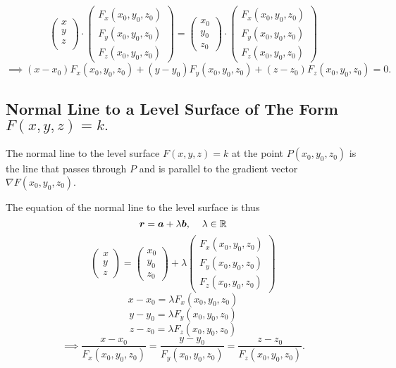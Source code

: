\documentclass{article}
\begin{document}
$$\begin{pmatrix}
    x\\
    y\\
    z\\
\end{pmatrix}\cdot\begin{pmatrix}
    F_x(x_0,y_0,z_0)\\
    F_y(x_0,y_0,z_0)\\
    F_z(x_0,y_0,z_0)
\end{pmatrix}=\begin{pmatrix}
    x_0\\
    y_0\\
    z_0
\end{pmatrix}\cdot\begin{pmatrix}
     F_x(x_0,y_0,z_0)\\
    F_y(x_0,y_0,z_0)\\
    F_z(x_0,y_0,z_0)
\end{pmatrix}$$
$$\implies(x-x_0)F_x(x_0,y_0,z_0)+(y-y_0)F_y(x_0,y_0,z_0)+(z-z_0)F_z(x_0,y_0,z_0)=0.$$
\subsection{Normal Line to a Level Surface of The Form $F(x,y,z)=k.$}
\begin{definition}
    The normal line to the level surface $F(x,y,z)=k$ at the point $P(x_0,y_0,z_0)$ is the line that passes through $P$ and is parallel to the gradient vector $\nabla F(x_0,y_0,z_0).$
\end{definition}
The equation of the normal line to the level surface is thus
$$\bm{r}=\bm{a}+\lambda\bm{b},\hspace{0.4cm}\lambda\in \mathbb{R}$$
$$\begin{pmatrix}
    x\\
    y\\
    z
\end{pmatrix}=\begin{pmatrix}
    x_0\\
    y_0\\
    z_0
\end{pmatrix}+\lambda\begin{pmatrix}
    F_x(x_0,y_0,z_0)\\
    F_y(x_0,y_0,z_0)\\
    F_z(x_0,y_0,z_0)
\end{pmatrix}$$
$$x-x_0=\lambda F_x(x_0,y_0,z_0)$$
$$y-y_0=\lambda F_y(x_0,y_0,z_0)$$
$$z-z_0=\lambda F_z(x_0,y_0,z_0)$$
$$\implies\frac{x-x_0}{F_x(x_0,y_0,z_0)}=\frac{y-y_0}{F_y(x_0,y_0,z_0)}=\frac{z-z_0}{F_z(x_0,y_0,z_0)}.$$
\end{document}
